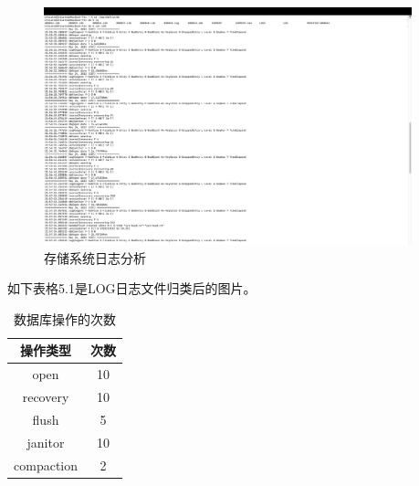 	\begin{figure}[H]
		\centering
		\includegraphics[width=0.95\textwidth]{images/radds_log.png}
		\caption{存储系统日志分析}
		\label{radds_log}
	\end{figure}

	如下表格5.1是LOG日志文件归类后的图片。

	\begin{table}[h!]
		\centering
		\begin{tabular}{|c|c|}
		\hline
		操作类型 & 次数 \\
		\hline
		open & 10 \\
		\hline
		recovery & 10 \\
		\hline
		flush & 5 \\
		\hline
		janitor & 10 \\
		\hline
		compaction & 2 \\
		\hline
		\end{tabular}
		\caption{数据库操作的次数}
		\label{tab:db}
	\end{table}
		




	
\clearpage